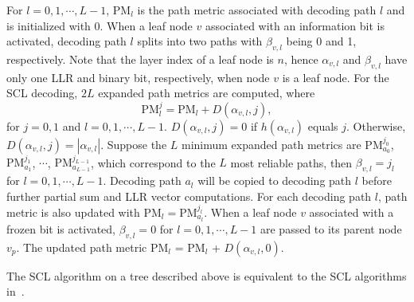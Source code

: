 \documentclass[journal]{IEEEtran}
\begin{document}
For $l=0,1,\cdots,L-1$, PM$_l$ is the path metric associated with decoding path $l$ and is initialized with 0.
When a leaf node $v$ associated with an information bit is activated, decoding path $l$ splits into two paths with $\beta_{v,l}$ being 0 and 1, respectively. Note that the layer index of a leaf node is $n$, hence $\alpha_{v,l}$ and $\beta_{v,l}$ have only one LLR and binary bit, respectively, when node $v$ is a leaf node. For the SCL decoding, $2L$ expanded path metrics are computed, where
\begin{equation}\label{equ: path_metric}
\mbox{PM}_l^j = \mbox{PM}_l+D(\alpha_{v,l},j),
\end{equation}
for $j=0,1$ and $l=0,1,\cdots,L-1$. $D(\alpha_{v,l},j) = 0$ if $h(\alpha_{v,l})$ equals $j$. Otherwise, $D(\alpha_{v,l},j) = |\alpha_{v,l}|$. Suppose the $L$ minimum expanded path metrics are $\mbox{PM}_{a_0}^{j_0}$, $\mbox{PM}_{a_1}^{j_1}$, $\cdots$, $\mbox{PM}_{a_{L-1}}^{j_{L-1}}$, which correspond to the $L$ most reliable paths, then $\beta_{v,l}=j_l$ for $l=0,1,\cdots,L-1$. Decoding path $a_l$ will be copied to decoding path $l$ before further partial sum and LLR vector computations. For each decoding path $l$, path metric is also updated with $\mbox{PM}_l = \mbox{PM}_{a_l}^{j_l}$.
When a leaf node $v$ associated with a frozen bit is activated, $\beta_{v,l} =0$ for $l=0,1,\cdots,L-1$ are passed to its parent node $v_p$. The updated path metric PM$_l$ = PM$_l$ + $D(\alpha_{v,l},0)$.

The SCL algorithm on a tree described above is equivalent to the SCL algorithms in~\cite{ido_it, tree_list_dec}.
\end{document}
